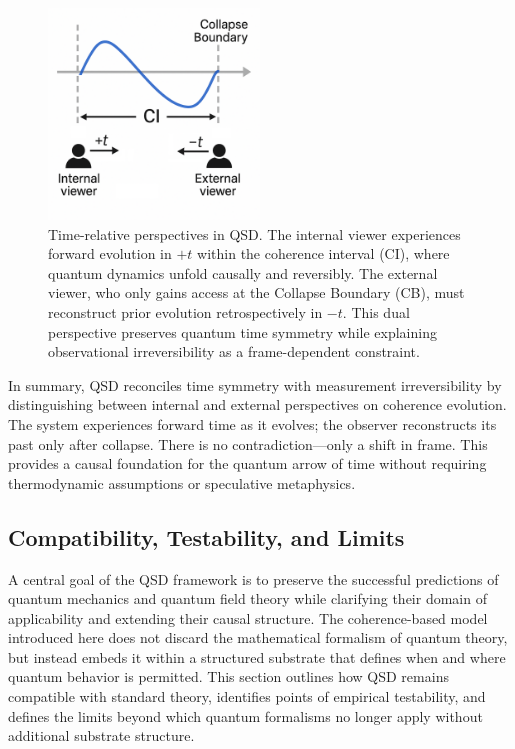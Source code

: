 \documentclass[entropy,article,submit,pdftex,moreauthors]{Definitions/mdpi}
\begin{document}
\begin{figure}[ht]
    \centering
    \includegraphics[width=0.50\textwidth]{figures/timing.pdf}
    \caption{Time-relative perspectives in QSD. The internal viewer experiences forward evolution in \( +t \) within the coherence interval (CI), where quantum dynamics unfold causally and reversibly. The external viewer, who only gains access at the Collapse Boundary (CB), must reconstruct prior evolution retrospectively in \( -t \). This dual perspective preserves quantum time symmetry while explaining observational irreversibility as a frame-dependent constraint.}
    \label{fig:timing-perspective}
\end{figure}


In summary, QSD reconciles time symmetry with measurement irreversibility by distinguishing between internal and external perspectives on coherence evolution. The system experiences forward time as it evolves; the observer reconstructs its past only after collapse. There is no contradiction—only a shift in frame. This provides a causal foundation for the quantum arrow of time without requiring thermodynamic assumptions or speculative metaphysics.

\subsection{Compatibility, Testability, and Limits}
\label{subsec:compatibility}

A central goal of the QSD framework is to preserve the successful predictions of quantum mechanics and quantum field theory while clarifying their domain of applicability and extending their causal structure. The coherence-based model introduced here does not discard the mathematical formalism of quantum theory, but instead embeds it within a structured substrate that defines when and where quantum behavior is permitted. This section outlines how QSD remains compatible with standard theory, identifies points of empirical testability, and defines the limits beyond which quantum formalisms no longer apply without additional substrate structure.
\end{document}
